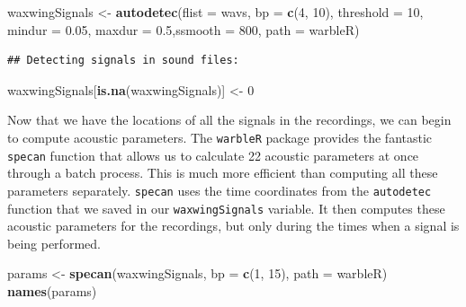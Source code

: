 \documentclass[
]{krantz}
\newenvironment{Shaded}{\begin{snugshade}}{\end{snugshade}}
\newcommand{\DataTypeTok}[1]{\textcolor[rgb]{0.13,0.29,0.53}{#1}}
\newcommand{\DecValTok}[1]{\textcolor[rgb]{0.00,0.00,0.81}{#1}}
\newcommand{\FloatTok}[1]{\textcolor[rgb]{0.00,0.00,0.81}{#1}}
\newcommand{\KeywordTok}[1]{\textcolor[rgb]{0.13,0.29,0.53}{\textbf{#1}}}
\newcommand{\NormalTok}[1]{#1}
\newcommand{\StringTok}[1]{\textcolor[rgb]{0.31,0.60,0.02}{#1}}
\begin{document}
\begin{Shaded}
\begin{Highlighting}[]
\NormalTok{waxwingSignals \textless{}{-}}\StringTok{ }\KeywordTok{autodetec}\NormalTok{(}\DataTypeTok{flist =}\NormalTok{ wavs, }\DataTypeTok{bp =} \KeywordTok{c}\NormalTok{(}\DecValTok{4}\NormalTok{, }\DecValTok{10}\NormalTok{), }
                \DataTypeTok{threshold =} \DecValTok{10}\NormalTok{, }\DataTypeTok{mindur =} \FloatTok{0.05}\NormalTok{,  }
                \DataTypeTok{maxdur =} \FloatTok{0.5}\NormalTok{,}\DataTypeTok{ssmooth =} \DecValTok{800}\NormalTok{, }
                \DataTypeTok{path =} \StringTok{\textquotesingle{}warbleR\textquotesingle{}}\NormalTok{)}
\end{Highlighting}
\end{Shaded}

\begin{verbatim}
## Detecting signals in sound files:
\end{verbatim}

\begin{Shaded}
\begin{Highlighting}[]
\NormalTok{waxwingSignals[}\KeywordTok{is.na}\NormalTok{(waxwingSignals)] \textless{}{-}}\StringTok{ }\DecValTok{0} 
\end{Highlighting}
\end{Shaded}

Now that we have the locations of all the signals in the recordings, we can begin to compute acoustic parameters. The \texttt{warbleR} package provides the fantastic \texttt{specan} function that allows us to calculate 22 acoustic parameters at once through a batch process. This is much more efficient than computing all these parameters separately. \texttt{specan} uses the time coordinates from the \texttt{autodetec} function that we saved in our \texttt{waxwingSignals} variable. It then computes these acoustic parameters for the recordings, but only during the times when a signal is being performed.

\begin{Shaded}
\begin{Highlighting}[]
\NormalTok{params \textless{}{-}}\StringTok{ }\KeywordTok{specan}\NormalTok{(waxwingSignals, }\DataTypeTok{bp =} \KeywordTok{c}\NormalTok{(}\DecValTok{1}\NormalTok{, }\DecValTok{15}\NormalTok{), }\DataTypeTok{path =} \StringTok{\textquotesingle{}warbleR\textquotesingle{}}\NormalTok{) }
\KeywordTok{names}\NormalTok{(params) }
\end{Highlighting}
\end{Shaded}
\end{document}
